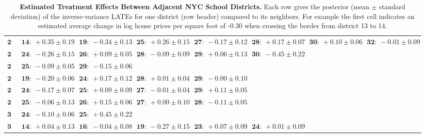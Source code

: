 \documentclass{article}
\begin{document}
\begin{sidewaystable}
\begin{tabular}{r|lllllll}
\( \mathbf{24} \)& \( \mathbf{14:}~+0.35 \pm 0.19 \)& \( \mathbf{19:}~-0.34 \pm 0.13 \)& \( \mathbf{25:}~+0.26 \pm 0.15 \)& \( \mathbf{27:}~-0.17 \pm 0.12 \)& \( \mathbf{28:}~+0.17 \pm 0.07 \)& \( \mathbf{30:}~+0.10 \pm 0.06 \)& \( \mathbf{32:}~-0.01 \pm 0.09 \)\\ 
\( \mathbf{25} \)& \( \mathbf{24:}~-0.26 \pm 0.15 \)& \( \mathbf{26:}~+0.09 \pm 0.05 \)& \( \mathbf{28:}~-0.09 \pm 0.09 \)& \( \mathbf{29:}~+0.06 \pm 0.13 \)& \( \mathbf{30:}~-0.45 \pm 0.22 \)\\ 
\( \mathbf{26} \)& \( \mathbf{25:}~-0.09 \pm 0.05 \)& \( \mathbf{29:}~-0.15 \pm 0.06 \)\\ 
\( \mathbf{27} \)& \( \mathbf{19:}~-0.20 \pm 0.06 \)& \( \mathbf{24:}~+0.17 \pm 0.12 \)& \( \mathbf{28:}~+0.01 \pm 0.04 \)& \( \mathbf{29:}~-0.00 \pm 0.10 \)\\ 
\( \mathbf{28} \)& \( \mathbf{24:}~-0.17 \pm 0.07 \)& \( \mathbf{25:}~+0.09 \pm 0.09 \)& \( \mathbf{27:}~-0.01 \pm 0.04 \)& \( \mathbf{29:}~+0.11 \pm 0.05 \)\\ 
\( \mathbf{29} \)& \( \mathbf{25:}~-0.06 \pm 0.13 \)& \( \mathbf{26:}~+0.15 \pm 0.06 \)& \( \mathbf{27:}~+0.00 \pm 0.10 \)& \( \mathbf{28:}~-0.11 \pm 0.05 \)\\ 
\( \mathbf{30} \)& \( \mathbf{24:}~-0.10 \pm 0.06 \)& \( \mathbf{25:}~+0.45 \pm 0.22 \)\\ 
\( \mathbf{32} \)& \( \mathbf{14:}~+0.04 \pm 0.13 \)& \( \mathbf{16:}~-0.04 \pm 0.08 \)& \( \mathbf{19:}~-0.27 \pm 0.15 \)& \( \mathbf{23:}~+0.07 \pm 0.09 \)& \( \mathbf{24:}~+0.01 \pm 0.09 \)\\ 
            \hline
        \end{tabular}
        \caption{
            \label{table:NYC_pairwise}
            \textbf{Estimated Treatment Effects Between Adjacent NYC School Districts.}
            Each row gives the posterior (mean \(\pm\) standard deviation) of the inverse-variance LATEs for one district (row header) compared to its neighbors.
            For example the first cell indicates an estimated average change in log house prices per square foot of -0.30 when crossing the border from district 13 to 14.
        }
\end{sidewaystable}


% 
% 
\end{document}
